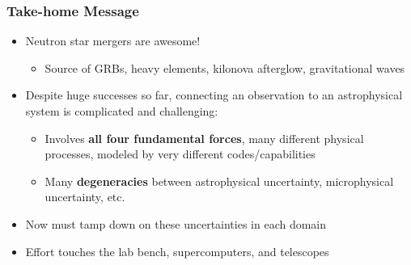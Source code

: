 \documentclass[]{beamer}
\begin{document}
\begin{frame}
  \frametitle{Take-home Message}
  \begin{itemize}
  \item Neutron star mergers are awesome!
    \begin{itemize}
    \item Source of GRBs, heavy elements, kilonova afterglow,
      gravitational waves
    \end{itemize}
  \item Despite huge successes so far, connecting an observation to an
    astrophysical system is complicated and challenging:
    \begin{itemize}
    \item Involves \textbf{all four fundamental forces}, many different physical processes, modeled by very different codes/capabilities
    \item Many \textbf{degeneracies} between astrophysical uncertainty, microphysical uncertainty, etc.
    \end{itemize}
  \item Now must tamp down on these uncertainties in each domain
  \item Effort touches the lab bench, supercomputers, and telescopes
  \end{itemize}
\end{frame}

\end{document}
